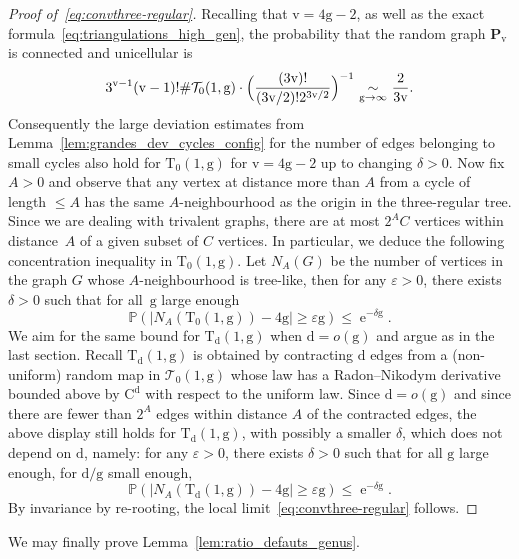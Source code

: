 \documentclass[10pt]{amsart}
\theoremstyle{plain}
\theoremstyle{definition}
\theoremstyle{remark}
\renewcommand{\P}{\mathbb{P}}
\newcommand{\e}{\operatorname{e}}
\newcommand{\Triv}{\mathrm{T}}
\newcommand{\defect}{\mathrm{d}}
\newcommand{\gen}{\mathrm{g}}
\newcommand{\ver}{\mathrm{v}}
\newcommand{\equi}[1][n]{\,\mathop{\sim}^{}_{#1 \to \infty}\,}
\begin{document}
\begin{proof}[Proof of~\eqref{eq:convthree-regular}]
Recalling that $\ver=4\gen-2$, as well as the exact formula~\eqref{eq:triangulations_high_gen}, the probability that the random graph $\mathbf{P}_{\ver}$ is connected and unicellular is
\[
{3^{\ver-1} (\ver-1)! \#\mathcal{T}_{0}(1,\gen)} \cdot \Bigl({ \frac{(3\ver)!}{(3\ver/2)! 2^{3\ver/2}}} \Bigr)^{-1}
\equi[\gen] \frac{2}{3\ver}.
\]
Consequently the large deviation estimates from Lemma~\ref{lem:grandes_dev_cycles_config} for the number of edges belonging to small cycles also hold for $ \Triv_{0}(1, \gen)$ for $\ver = 4 \gen-2$ up to changing $\delta >0$.
Now fix $A>0$ and observe that any vertex at distance more than $ A$ from a cycle of length $ \leq A$ has the same $A$-neighbourhood as the origin in the three-regular tree. Since we are dealing with trivalent graphs, there are at most $ 2^{A}C$ vertices within distance~$A$ of a given subset of $C$ vertices. In particular, we deduce the following concentration inequality in $ \Triv_{ 0}(1, \gen)$. Let $ N_{A}(G)$ be the number of vertices in the graph $G$ whose $A$-neighbourhood is tree-like, then for any $\varepsilon>0$, there exists $\delta >0$ such that for all~$\gen$ large enough
\[
\P(|N_{A}(\Triv_{ 0}(1, \gen)) - 4\gen| \geq \varepsilon \gen) \leq \e^{-\delta \gen}.
\]
We aim for the same bound for $\Triv_{\defect}(1, \gen)$ when $ \defect = o(\gen)$ and argue as in the last section. Recall $ \Triv_{ \defect}(1, \gen)$ is obtained by contracting $ \defect$ edges from a (non-uniform) random map in $\mathcal{T}_0(1, \gen)$ whose law has a Radon--Nikodym derivative bounded above by $\mathrm{C}^{ \defect}$ with respect to the uniform law. Since $ \defect = o(\gen)$ and since there are fewer than $2^{A}$ edges within distance $A$ of the contracted edges, the above display still holds for $ \Triv_{ \defect}(1, \gen)$, with possibly a smaller $\delta$, which does not depend on $\defect$, namely: for any $\varepsilon>0$, there exists $\delta >0$ such that for all $\gen$ large enough, for $\defect/\gen$ small enough,
\begin{equation}\label{eq:grandes_dev_high_gen}
\P(|N_{A}(\Triv_{\defect}(1, \gen)) - 4\gen| \geq \varepsilon \gen) \leq \e^{-\delta \gen}.
\end{equation}
By invariance by re-rooting, the local limit~\eqref{eq:convthree-regular} follows.
\end{proof}

We may finally prove Lemma~\ref{lem:ratio_defauts_genus}.
\end{document}
